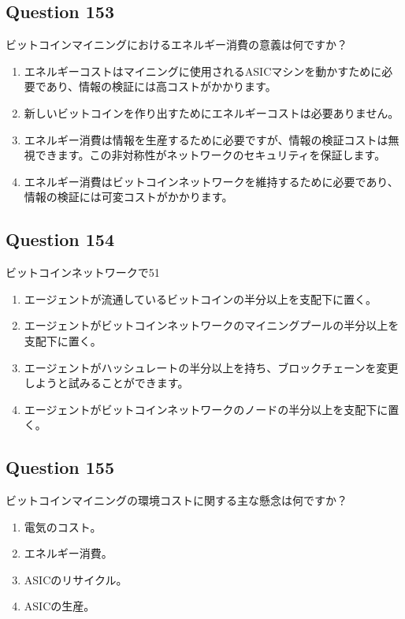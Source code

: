 \documentclass[12pt,a4paper]{article}
\begin{document}
\bigskip


\subsection*{Question 153}
ビットコインマイニングにおけるエネルギー消費の意義は何ですか？

\begin{enumerate}[label=\Alph*., leftmargin=*]
\item エネルギーコストはマイニングに使用されるASICマシンを動かすために必要であり、情報の検証には高コストがかかります。
\item 新しいビットコインを作り出すためにエネルギーコストは必要ありません。
\item エネルギー消費は情報を生産するために必要ですが、情報の検証コストは無視できます。この非対称性がネットワークのセキュリティを保証します。
\item エネルギー消費はビットコインネットワークを維持するために必要であり、情報の検証には可変コストがかかります。
\end{enumerate}

\bigskip


\subsection*{Question 154}
ビットコインネットワークで51%

\begin{enumerate}[label=\Alph*., leftmargin=*]
\item エージェントが流通しているビットコインの半分以上を支配下に置く。
\item エージェントがビットコインネットワークのマイニングプールの半分以上を支配下に置く。
\item エージェントがハッシュレートの半分以上を持ち、ブロックチェーンを変更しようと試みることができます。
\item エージェントがビットコインネットワークのノードの半分以上を支配下に置く。
\end{enumerate}

\bigskip


\subsection*{Question 155}
ビットコインマイニングの環境コストに関する主な懸念は何ですか？

\begin{enumerate}[label=\Alph*., leftmargin=*]
\item 電気のコスト。
\item エネルギー消費。
\item ASICのリサイクル。
\item ASICの生産。
\end{enumerate}
\end{document}
